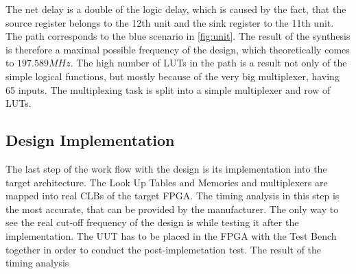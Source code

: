 The net delay is a double of the logic delay, which is caused by the fact, that the source register belongs to the 12th unit and the sink register to the 11th unit. The path corresponds to the blue scenario in \autoref{fig:unit}. The result of the synthesis is therefore a maximal possible frequency of the design, which theoretically comes to $197.589 MHz$. The high number of LUTs in the path is a result not only of the simple logical functions, but mostly because of the very big multiplexer, having 65 inputs. The multiplexing task is split into a simple multiplexer and row of LUTs.

\subsection{Design Implementation}
The last step of the work flow with the design is its implementation into the target architecture. The Look Up Tables and Memories and multiplexers are mapped into real CLBs of the target FPGA. The timing analysis in this step is the most accurate, that can be provided by the manufacturer. The only way to see the real cut-off frequency of the design is while testing it after the implementation. The UUT has to be placed in the FPGA with the Test Bench together in order to conduct the post-implemetation test. The result of the timing analysis 



